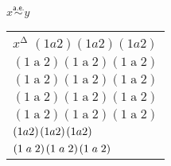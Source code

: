 \documentclass{standalone}
\def\foo{FOO}
\def\goo{BAR}
\def\hoo{BAZ}
\providecommand{\CMD}{\alias}
\def\rep#1{#1#1#1}
\def\foo{\mathrel{a}}
\def\goo{{\mathrel{a}}}
\def\hoo{\bgroup\mathrel{a}\egroup}
\def\koo{\begingroup\mathrel{a}\endgroup}
\newcommand\myrel{\mathrel{\overset{\textsf{a.e.}}{\sim}}}
\begin{document}
$x\myrel y$

\begin{tabular}{l}$x^\increment$
\rep{${(1\mathord{a}2)}$} \\
\rep{${(1\mathbin{a}2)}$} \\
\rep{${(1\mathrel{a}2)}$} \\
\rep{${(1\foo2)}$} \\
\rep{${(1\goo2)}$} \\
\rep{${(1\hoo2)}$} \\
\rep{${(1\koo2)}$} \\
\end{tabular}
\end{document}
